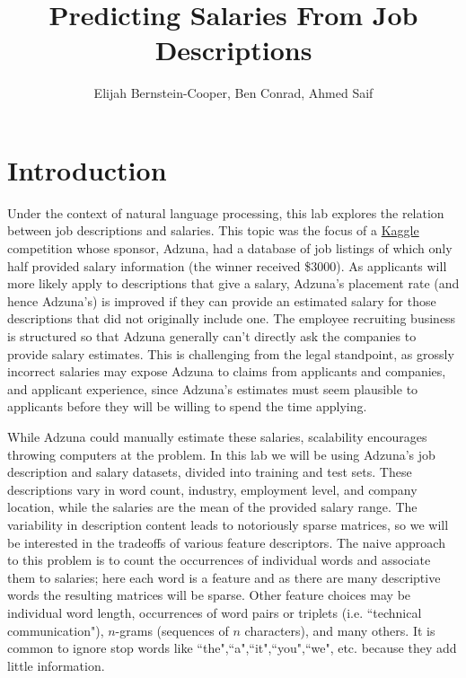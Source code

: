 \documentclass[12pt]{article}
\begin{document}
\title{Predicting Salaries From Job Descriptions}

\author{
Elijah Bernstein-Cooper, Ben Conrad, Ahmed Saif
}
\maketitle



\section{Introduction}

    Under the context of natural language processing, this lab explores the
    relation between job descriptions and salaries.  This topic was the focus
    of a \href{http://www.kaggle.com/c/job-salary-prediction}{Kaggle}
    competition whose sponsor, Adzuna, had a database of job listings of which
    only half provided salary information (the winner received \$3000).  As
    applicants will more likely apply to descriptions that give a salary,
    Adzuna's placement rate (and hence Adzuna's) is improved if they can provide
    an estimated salary for those descriptions that did not originally include
    one. The employee recruiting business is structured so that Adzuna
    generally can't directly ask the companies to provide salary estimates.
    This is challenging from the legal standpoint, as grossly incorrect	
    salaries may expose Adzuna to claims from applicants and companies, and
    applicant experience, since Adzuna's estimates must seem plausible to
    applicants before they will be willing to spend the time applying.

    While Adzuna could manually estimate these salaries, scalability encourages
    throwing computers at the problem.  In this lab we will be using Adzuna's
    job description and salary datasets, divided into training and test sets.
    These descriptions vary in word count, industry, employment level, and
    company location, while the salaries are the mean of the provided salary
    range.  The variability in description content leads to notoriously sparse
    matrices, so we will be interested in the tradeoffs of various feature
    descriptors.  The naive approach to this problem is to count the
    occurrences of individual words and associate them to salaries; here each
    word is a feature and as there are many descriptive words the resulting
    matrices will be sparse.  Other feature choices may be individual word
    length, occurrences of word pairs or triplets (i.e. ``technical
    communication"), $n$-grams (sequences of $n$ characters), and many others.
    It is common to ignore stop words like ``the",``a",``it",``you",``we",
    etc.  because they add little information.
\end{document}
